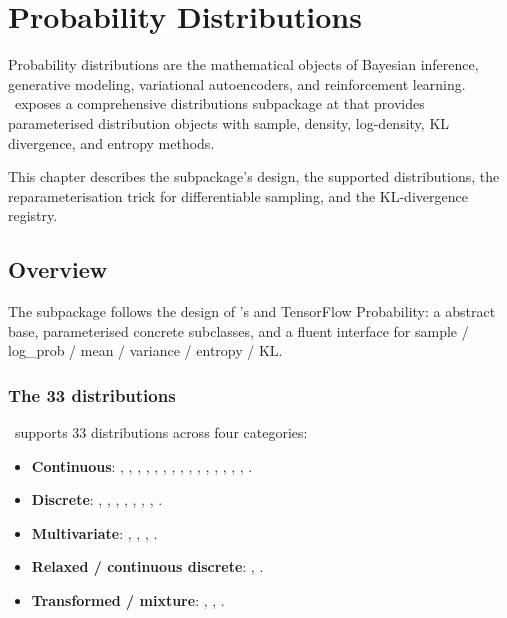 \chapter{Probability Distributions}
\label{ch:distributions}

Probability distributions are the mathematical objects of
Bayesian inference, generative modeling, variational autoencoders,
and reinforcement learning. \Lucid\ exposes a comprehensive
distributions subpackage at  that
provides parameterised distribution objects with sample, density,
log-density, KL divergence, and entropy methods.

This chapter describes the subpackage's design, the supported
distributions, the reparameterisation trick for differentiable
sampling, and the KL-divergence registry.

\section{Overview}
\label{sec:distributions:overview}

The subpackage follows the design of 's
 and TensorFlow Probability: a
 abstract base, parameterised concrete
subclasses, and a fluent interface for sample / log\_prob / mean
/ variance / entropy / KL.

\subsection{The 33 distributions}
\label{ssec:distributions:catalogue}

\Lucid\ supports 33 distributions across four categories:

\begin{itemize}
  \item \textbf{Continuous}: , ,
    , , ,
    , , ,
    , , ,
    , , ,
    , .
  \item \textbf{Discrete}: , ,
    , , ,
    , ,
    .
  \item \textbf{Multivariate}: ,
    , , .
  \item \textbf{Relaxed / continuous discrete}:
    , .
  \item \textbf{Transformed / mixture}: ,
    , .
\end{itemize}

